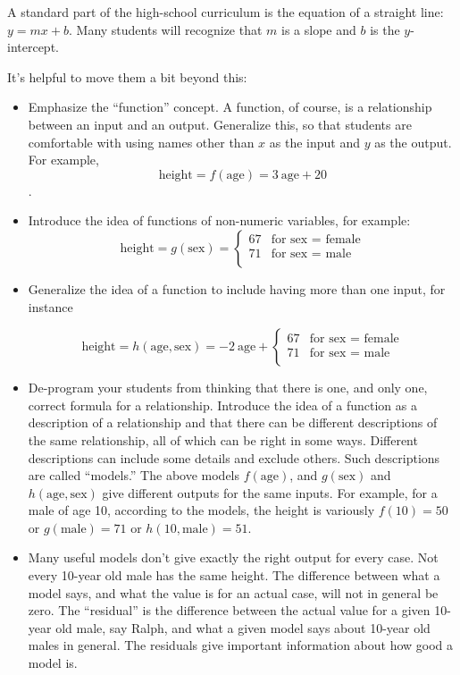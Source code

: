 A standard part of the high-school curriculum is the equation of a
straight line: $y = m x + b$.  Many students will recognize that $m$
is a slope and $b$ is the $y$-intercept.  

It's helpful to move them a bit beyond this:
\begin{itemize}
\item Emphasize the ``function'' concept.  A function, of course, is a
  relationship between an input and an output.  Generalize this, so
  that students are comfortable with using names other than $x$ as the
  input and
  $y$ as the output.  For example, 
  $$\mbox{height} = f( \mbox{age} ) = 3\ \mbox{age} + 20$$.
  
\item Introduce the idea of functions of non-numeric variables, for example:
$$\mbox{height} = g( \mbox{sex} ) = \left\{ \begin{array}{ll}
      67 & \mbox{for sex $=$ female}\\
      71 & \mbox{for sex $=$ male}\\
      \end{array}\right.$$
   
\item Generalize the idea of a function to include having more than
  one input, for instance

$$\mbox{height} = h( \mbox{age}, \mbox{sex} ) = -2\ \mbox{age} + 
      \left\{ \begin{array}{ll}
      67 & \mbox{for sex $=$ female}\\
      71 & \mbox{for sex $=$ male}\\
      \end{array}\right.$$

\item  De-program your students from thinking that there is one, and
  only one, correct formula for a relationship.  Introduce the idea of a function as a
  description of a relationship and that there can be different descriptions of the same
  relationship, all of which can be right in some ways.  Different
  descriptions can include some details and exclude others. Such
  descriptions are called ``models.''  The above models
  $f(\mbox{age})$, and $g(\mbox{sex})$ and $h(\mbox{age}, \mbox{sex})$
  give different outputs for the same inputs.  For example, for a male
  of age 10, according to the models, the height is variously $f(10) =
  50$ or $g(\mbox{male}) = 71$ or $h(10, \mbox{male}) = 51$.
  
\item  Many useful models don't give exactly the right output for
  every case.  Not every 10-year old male has the same height.  The
  difference between what a model says, and what the value is for an
  actual case, will not in general be zero.  The ``residual'' is the difference between
  the actual value for a given 10-year old male, say Ralph, and what
  a given model says about 10-year old males in general.  The
  residuals give important information about how good a model is.
   
\end{itemize}


